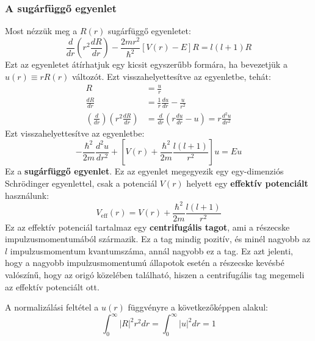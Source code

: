 \documentclass[../main.tex]{subfiles}
\begin{document}
\subsubsection{A sugárfüggő egyenlet}
Most nézzük meg a $R(r)$ sugárfüggő egyenletet:
\begin{equation}
    \frac{d}{dr} \left(r^2 \frac{d R}{d r} \right) - \frac{2 m r^2}{\hbar^2} [V(r) - E] R = l(l+1) R
\end{equation}
Ezt az egyenletet átírhatjuk egy kicsit egyszerűbb formára, ha bevezetjük a $u(r) \equiv r R(r)$ változót. Ezt visszahelyettesítve az egyenletbe, tehát:
\begin{equation}
    \begin{aligned}
        R &= \frac{u}{r} \\
        \frac{d R}{d r} &= \frac{1}{r} \frac{d u}{d r} - \frac{u}{r^2} \\
        \left(\frac{d}{dr}\right) \left(r^2 \frac{d R}{d r} \right) &= \frac{d}{d r} \left( r \frac{d u}{d r} - u \right) = r \frac{d^2 u}{d r^2}
    \end{aligned}
\end{equation}
Ezt visszahelyettesítve az egyenletbe:
\begin{equation}
    \boxed{- \frac{\hbar^2}{2m} \frac{d^2 u}{d r^2} + \left[ V(r) + \frac{\hbar^2}{2m}\frac{l(l+1)}{r^2} \right] u = E u}
\end{equation}
Ez a \textbf{sugárfüggő egyenlet}. Ez az egyenlet megegyezik egy egy-dimenziós Schrödinger egyenlettel, csak a potenciál $V(r)$ helyett egy \textbf{effektív potenciált} használunk:
\begin{equation}
    V_{\text{eff}} (r) = V(r) + \frac{\hbar^2}{2m}\frac{l(l+1)}{r^2}
\end{equation}
Ez az effektív potenciál tartalmaz egy \textbf{centrifugális tagot}, ami a részecske impulzusmomentumából származik. Ez a tag mindig pozitív, és minél nagyobb az $l$ impulzusmomentum kvantumszáma,
annál nagyobb ez a tag. Ez azt jelenti, hogy a nagyobb impulzusmomentumú állapotok esetén a részecske kevésbé valószínű, hogy az origó közelében található, hiszen a centrifugális tag megemeli az effektív potenciált ott.

A normalizálási feltétel a $u(r)$ függvényre a következőképpen alakul:
\begin{equation}
    \int_0^{\infty} |R|^2 r^2 dr = \int_0^{\infty} |u|^2 dr = 1
\end{equation}
\end{document}
